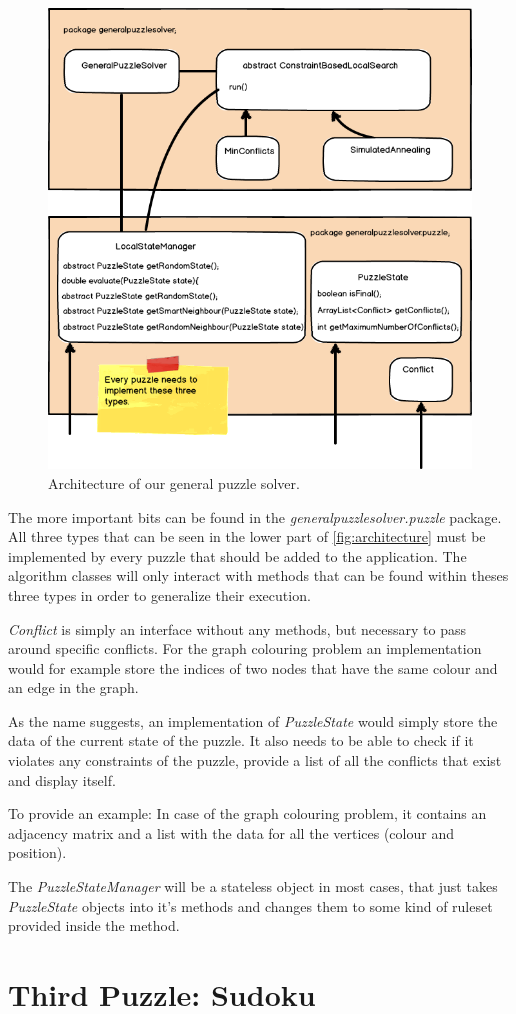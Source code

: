 \documentclass{scrartcl}
\begin{document}
 \begin{figure}[!htbp]
 \includegraphics[width=1.0\linewidth]{graphics/architecture-diagram.png}
\caption{Architecture of our general puzzle solver.}\label{fig:architecture}
 \end{figure}

The more important bits can be found in the \textit{generalpuzzlesolver.puzzle} package. All three types that can be seen in the lower part of \autoref{fig:architecture} must be implemented by every puzzle that should be added to the application. The algorithm classes will only interact with methods that can be found within theses three types in order to generalize their execution.

\textit{Conflict} is simply an interface without any methods, but necessary to pass around specific conflicts. For the graph colouring problem an implementation would for example store the indices of two nodes that have the same colour and an edge in the graph.

As the name suggests, an implementation of \textit{PuzzleState} would simply store the data of the current state of the puzzle. It also needs to be able to check if it violates any constraints of the puzzle, provide a list of all the conflicts that exist and display itself.

To provide an example: In case of the graph colouring problem, it contains an adjacency matrix and a list with the data for all the vertices (colour and position).

The \textit{PuzzleStateManager} will be a stateless object in most cases, that just takes \textit{PuzzleState} objects into it's methods and changes them to some kind of ruleset provided inside the method.



\section{Third Puzzle: Sudoku}
\end{document}
